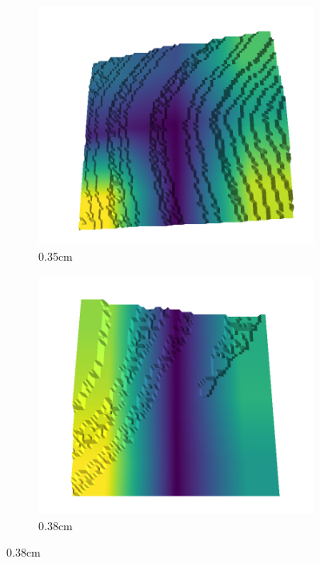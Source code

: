 \begin{figure}[H]
    \begin{subfigure}[b]{0.192\linewidth}
    \includegraphics[width=\linewidth]{../img/5/quarry/best/34-patch-3d-majavi-colormap-30.png}
    \caption{0.35cm}
    \label{fig : quarry-best-3}
    \end{subfigure}
    \begin{subfigure}[b]{0.192\linewidth}
    \includegraphics[width=\linewidth]{../img/5/quarry/best/38-patch-3d-majavi-colormap-40.png}
    \caption{0.38cm}

\end{subfigure}
\end{figure}
